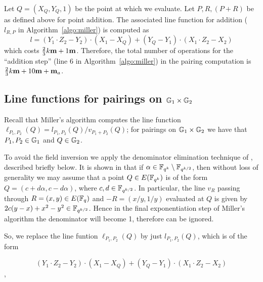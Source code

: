 Let $Q = (X_{Q},Y_{Q},1)$ be the point at which we evaluate.
Let $P,R,(P+R)$ be as defined above for point addition.
The associated line function for addition
($l_{R,P}$ in Algorithm~\ref{algo:miller})
is computed as
$$l = (Y_1 \cdot Z_2 - Y_2) \cdot (X_1 - X_{Q}) + (Y_{Q} - Y_1) \cdot (X_1 \cdot Z_2 - X_2) $$
which costs
$\frac{2}{3}k\textbf{m} + 1\textbf{m}$.
Therefore, the total number of operations for the ``addition step''
({line 6} in Algorithm~\ref{algo:miller}) in the pairing computation is
$\frac{2}{3}k\textbf{m} + 10\textbf{m} + \textbf{m}_a$.

\subsection{Line functions for pairings on $\mathbb{G}_{1} \times \mathbb{G}_{2}$}

Recall that Miller's algorithm computes the line function 
$\ell_{P_1,P_2}(Q) = l_{P_1,P_2}(Q)/v_{P_1 + P_2}(Q)$;
for pairings on $\mathbb{G}_{1} \times \mathbb{G}_{2}$ we have that $P_1, P_2 \in \mathbb{G}_{1}$ and $Q \in \mathbb{G}_{2}$.

To avoid the field inversion we apply the denominator elimination technique of \cite{GGX10},
described briefly below. 
It is shown in \cite[Section 4]{GGX10} that if
$\alpha \in \mathbb{F}_{q^k} \setminus \mathbb{F}_{q^{k/2}}$, then
without loss of generality we may assume that a point
$Q \in E(\mathbb{F}_{q^k})$ is of the form
$Q = (c+d\alpha, c-d\alpha )$, where
$c, d \in \mathbb{F}_{q^{k/2}}$.
In particular, the line $v_R$ passing through $R = (x,y) \in E(\mathbb{F}_{q})$ 
and $-R = (x/y, 1/y)$ evaluated at $Q$ is given by
$2c(y-x) + x^2-y^2 \in \mathbb{F}_{q^{k/2}}$.
Hence in the final exponentiation step of Miller's algorithm the denominator will become 1,
therefore can be ignored.

So, we replace the line funtion $\ell_{P_1,P_2}(Q)$ by just $l_{P_1,P_2}(Q)$, which is of the form

$$ (Y_1 \cdot Z_2 - Y_2) \cdot (X_1 - X_{Q}) + (Y_{Q} - Y_1) \cdot (X_1 \cdot Z_2 - X_2) $$,

